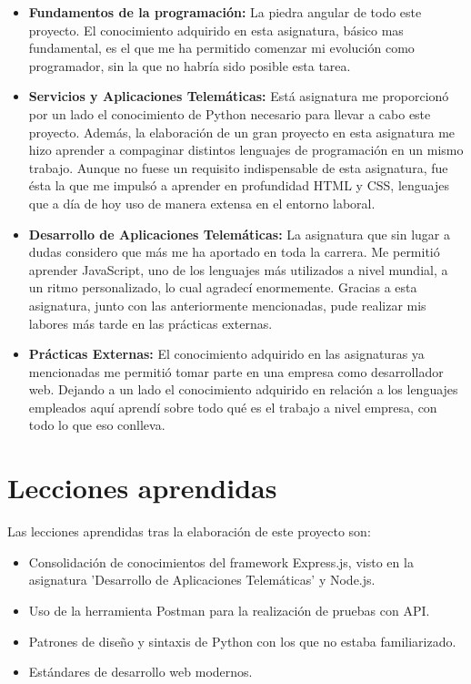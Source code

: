 \documentclass[a4paper, 12pt]{book}
\begin{document}
\begin{itemize}
    \item \textbf{Fundamentos de la programación: } La piedra angular de todo este proyecto. El conocimiento adquirido en esta asignatura, básico mas fundamental, es el que me ha permitido comenzar mi evolución como programador, sin la que no habría sido posible esta tarea.

    \item \textbf{Servicios y Aplicaciones Telemáticas: } Está asignatura me proporcionó por un lado el conocimiento de Python necesario para llevar a cabo este proyecto. Además, la elaboración de un gran proyecto en esta asignatura me hizo aprender a compaginar distintos lenguajes de programación en un mismo trabajo. Aunque no fuese un requisito indispensable de esta asignatura, fue ésta la que me impulsó a aprender en profundidad HTML y CSS, lenguajes que a día de hoy uso de manera extensa en el entorno laboral.

    \item \textbf{Desarrollo de Aplicaciones Telemáticas: } La asignatura que sin lugar a dudas considero que más me ha aportado en toda la carrera. Me permitió aprender JavaScript, uno de los lenguajes más utilizados a nivel mundial, a un ritmo personalizado, lo cual agradecí enormemente. Gracias a esta asignatura, junto con las anteriormente mencionadas, pude realizar mis labores más tarde en las prácticas externas.

    \item \textbf{Prácticas Externas: } El conocimiento adquirido en las asignaturas ya mencionadas me permitió tomar parte en una empresa como desarrollador web. Dejando a un lado el conocimiento adquirido en relación a los lenguajes empleados aquí aprendí sobre todo qué es el trabajo a nivel empresa, con todo lo que eso conlleva.
    
\end{itemize}


\section{Lecciones aprendidas}
\label{sec:lecciones_aprendidas}

Las lecciones aprendidas tras la elaboración de este proyecto son:

\begin{itemize}
    \item Consolidación de conocimientos del framework Express.js, visto en la asignatura 'Desarrollo de Aplicaciones Telemáticas' y Node.js.
    \item Uso de la herramienta Postman para la realización de pruebas con API.
    \item Patrones de diseño y sintaxis de Python con los que no estaba familiarizado.
    \item Estándares de desarrollo web modernos.
\end{itemize}
\end{document}
